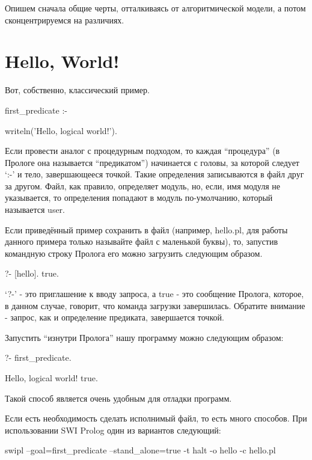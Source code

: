 \documentclass[a4paper]{book}
\begin{document}
Опишем сначала общие черты, отталкиваясь от алгоритмической
модели, а потом сконцентрируемся на различиях.

\section{Hello, World!}

Вот, собственно, классический пример.

\begin{example}{}{}
first_predicate :-

   writeln('Hello, logical world!').
\end{example}

Если провести аналог с процедурным подходом, то каждая
``процедура'' (в Прологе она называется ``предикатом'')
начинается с головы, за которой следует `:-' и тело,
завершающееся точкой. Такие определения записываются в файл друг
за другом. Файл, как правило, определяет модуль, но, если, имя
модуля не указывается, то определения попадают в модуль
по-умолчанию, который называется user.

Если приведённый пример сохранить в файл (например, hello.pl, для
работы данного примера только называйте файл с маленькой буквы),
то, запустив командную строку Пролога его можно загрузить
следующим образом.

\begin{example}{}{}
?- [hello].
true.
\end{example}

`?-' - это приглашение к вводу запроса, а true - это сообщение
Пролога, которое, в данном случае, говорит, что команда загрузки
завершилась. Обратите внимание - запрос, как и определение
предиката, завершается точкой.

Запустить ``изнутри Пролога'' нашу программу можно следующим
образом:

\begin{example}{}{}
?- first_predicate.

Hello, logical world!
true.
\end{example}

Такой способ является очень удобным для отладки программ.

Если есть необходимость сделать исполнимый файл, то есть много
способов. При использовании SWI Prolog один из вариантов
следующий:

\begin{example}{}{}
swipl --goal=first_predicate --stand_alone=true -t halt -o hello -c hello.pl
\end{example}
\end{document}
